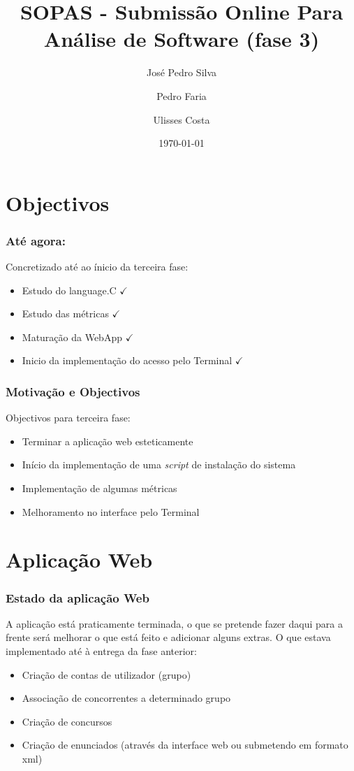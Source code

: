 \documentclass{beamer}
\title{SOPAS - Submissão Online Para Análise de Software (fase 3)}
\author{José Pedro Silva \and
Pedro Faria \and
Ulisses Costa
}
\date{\today}
\institute{Engenharia de Linguagens\\
Projecto integrado
}
\begin{document}
\begin{frame}
   \titlepage
\end{frame}

\section{Objectivos}
\begin{frame} \frametitle{Até agora:}
Concretizado até ao ínicio da terceira fase:
\begin{itemize}
\item Estudo do language.C {\color{green}$\checkmark$}
\item Estudo das métricas {\color{green}$\checkmark$}
\item Maturação da WebApp {\color{green}$\checkmark$}
\item Inicio da implementação do acesso pelo Terminal {\color{green}$\checkmark$}
\end{itemize}
\end{frame}

\begin{frame} \frametitle{Motivação e Objectivos}
Objectivos para terceira fase:
\begin{itemize}
\item Terminar a aplicação web esteticamente
\item Início da implementação de uma \emph{script} de instalação do sistema
\item Implementação de algumas métricas
\item Melhoramento no interface pelo Terminal
\end{itemize}
\end{frame}

\section{Aplicação Web}
\begin{frame}[fragile] \frametitle{Estado da aplicação Web}
A aplicação está praticamente terminada, o que se pretende fazer daqui para a frente será melhorar o que está feito e adicionar alguns extras. O que estava implementado até à entrega da fase anterior:
\begin{itemize}
\item Criação de contas de utilizador (grupo)
\item Associação de concorrentes a determinado grupo
\item Criação de concursos
\item Criação de enunciados (através da interface web ou submetendo em formato xml)
\end{itemize}
\end{frame}
\end{document}
